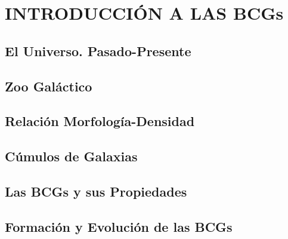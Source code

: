 
\chapter{INTRODUCCI\'ON A LAS BCGs} %

\label{Chapter2} %

\section{El Universo. Pasado-Presente}


\section{Zoo Gal\'actico}
\section{Relaci\'on Morfolog\'ia-Densidad}
\section{C\'umulos de Galaxias}
\section{Las BCGs y sus Propiedades}
\section{Formaci\'on y Evoluci\'on de las BCGs}